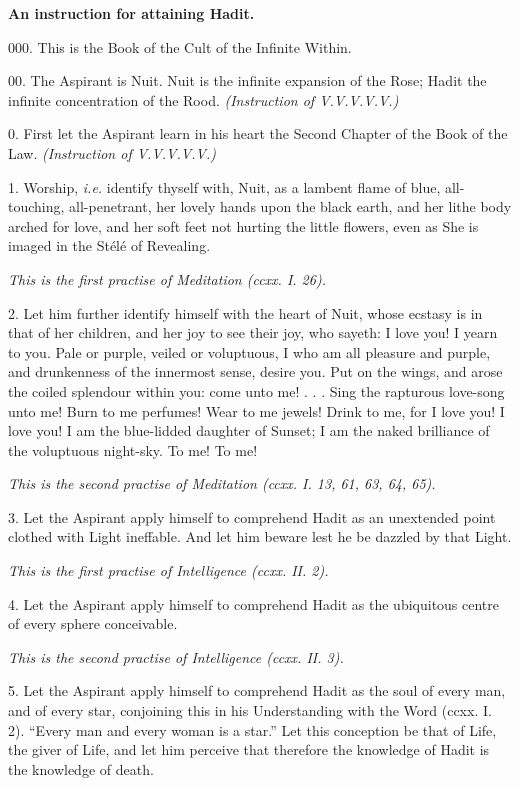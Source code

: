 

\textbf{An instruction for attaining Hadit.}

000. This is the Book of the Cult of the Infinite Within.

00. The Aspirant is Nuit. Nuit is the infinite expansion of the Rose; Hadit the infinite concentration of the Rood. \textit{(Instruction of V.V.V.V.V.)}

0. First let the Aspirant learn in his heart the Second Chapter of the Book of the Law. \textit{(Instruction of V.V.V.V.V.)}

1. Worship, \textit{i.e.} identify thyself with, Nuit, as a lambent flame of blue, all-touching, all-penetrant, her lovely hands upon the black earth, and her lithe body arched for love, and her soft feet not hurting the little flowers, even as She is imaged in the St\'{e}l\'{e} of Revealing.

\textit{This is the first practise of Meditation (ccxx. I. 26).}

2. Let him further identify himself with the heart of Nuit, whose ecstasy is in that of her children, and her joy to see their joy, who sayeth: I love you! I yearn to you. Pale or purple, veiled or voluptuous, I who am all pleasure and purple, and drunkenness of the innermost sense, desire you. Put on the wings, and arose the coiled splendour within you: come unto me! . . . Sing the rapturous love-song unto me! Burn to me perfumes! Wear to me jewels! Drink to me, for I love you! I love you! I am the blue-lidded daughter of Sunset; I am the naked brilliance of the voluptuous night-sky. To me! To me!

\textit{This is the second practise of Meditation (ccxx. I. 13, 61, 63, 64, 65).}

3. Let the Aspirant apply himself to comprehend Hadit as an unextended point clothed with Light ineffable. And let him beware lest he be dazzled by that Light.

\textit{This is the first practise of Intelligence (ccxx. II. 2).}

4. Let the Aspirant apply himself to comprehend Hadit as the ubiquitous centre of every sphere conceivable.

\textit{This is the second practise of Intelligence (ccxx. II. 3).}

5. Let the Aspirant apply himself to comprehend Hadit as the soul of every man, and of every star, conjoining this in his Understanding with the Word (ccxx. I. 2). \enquote{Every man and every woman is a star.} Let this conception be that of Life, the giver of Life, and let him perceive that therefore the knowledge of Hadit is the knowledge of death.


